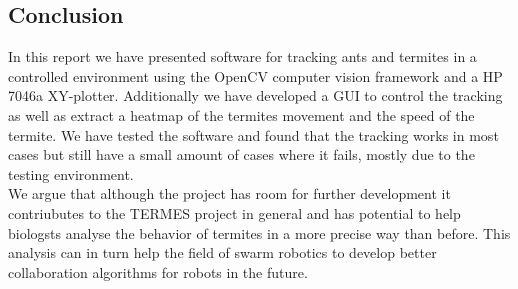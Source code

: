
\subsection{Conclusion}

In this report we have presented software for tracking ants and termites in a controlled environment using the OpenCV computer vision framework and a HP 7046a XY-plotter. Additionally we have developed a GUI to control the tracking as well as extract a heatmap of the termites movement and the speed of the termite. We have tested the software and found that the tracking works in most cases but still have a small amount of cases where it fails, mostly due to the testing environment. \\

We argue that although the project has room for further development it contriubutes to the TERMES project in general and has potential to help biologsts analyse the behavior of termites in a more precise way than before. This analysis can in turn help the field of swarm robotics to develop better collaboration algorithms for robots in the future.
